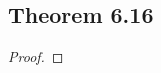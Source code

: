 \documentclass[../../main.tex]{subfiles}
\begin{document}
\subsection{Theorem 6.16}
\begin{wts}

\end{wts}
\begin{proof}

\end{proof}
\end{document}
